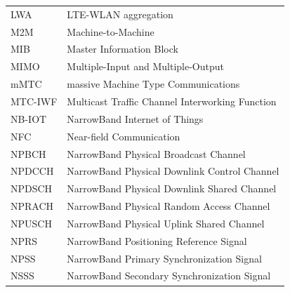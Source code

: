 \documentclass[finnish, 12pt, a4paper, elec, latin1, utf8, online]{aaltothesis}
\begin{document}
\begin{tabular}{ll}
LWA & LTE-WLAN aggregation \\
M2M & Machine-to-Machine \\
MIB & Master Information Block \\
MIMO & Multiple-Input and Multiple-Output \\
mMTC & massive Machine Type Communications \\
MTC-IWF & Multicast Traffic Channel Interworking Function \\
NB-IOT & NarrowBand Internet of Things \\
NFC & Near-field Communication \\
NPBCH & NarrowBand Physical Broadcast Channel \\
NPDCCH & NarrowBand Physical Downlink Control Channel \\
NPDSCH & NarrowBand Physical Downlink Shared Channel \\
NPRACH & NarrowBand Physical Random Access Channel \\
NPUSCH & NarrowBand Physical Uplink Shared Channel \\
NPRS & NarrowBand Positioning Reference Signal \\
NPSS & NarrowBand Primary Synchronization Signal \\
NSSS & NarrowBand Secondary Synchronization Signal \\
\end{tabular}
\clearpage
\end{document}
